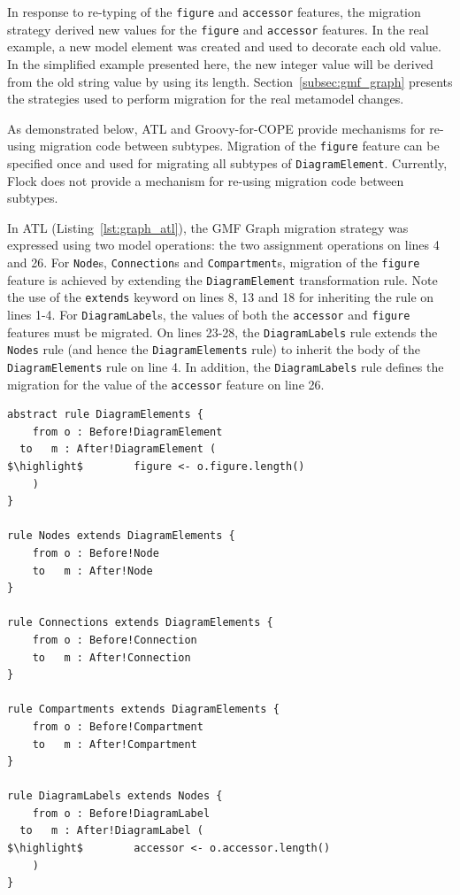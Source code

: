 In response to re-typing of the \texttt{figure} and \texttt{accessor} features, the
migration strategy derived new values for the \texttt{figure} and \texttt{accessor} features. In the real example, a new model element was created and used to decorate \cite{gamma95patterns} each old value. In the simplified example presented here, the new integer value will be derived from the old string value by using its length. Section~\ref{subsec:gmf_graph} presents the strategies used to perform migration for the real metamodel changes.

As demonstrated below, ATL and Groovy-for-COPE provide mechanisms for re-using migration code between subtypes. Migration of the \texttt{figure} feature can be specified once and used for migrating all subtypes of \texttt{DiagramElement}. Currently, Flock does not provide a mechanism for re-using migration code between subtypes.

In ATL (Listing~\ref{lst:graph_atl}), the GMF Graph migration strategy was expressed using two model operations: the two assignment operations on lines 4 and 26. For \texttt{Node}s, \texttt{Connection}s and \texttt{Compartment}s, migration of the \texttt{figure} feature is achieved by extending the \texttt{DiagramElement} transformation rule. Note the use of the \texttt{extends} keyword on lines 8, 13 and 18 for inheriting the rule on lines 1-4. For \texttt{DiagramLabel}s, the values of both the \texttt{accessor} and \texttt{figure} features must be migrated. On lines 23-28, the \texttt{DiagramLabels} rule extends the \texttt{Nodes} rule (and hence the \texttt{DiagramElements} rule) to inherit the body of the \texttt{DiagramElements} rule on line 4. In addition, the \texttt{DiagramLabels} rule defines the migration for the value of the \texttt{accessor} feature on line 26.

\begin{lstlisting}[float=tbp, caption=Simplified GMF Graph model migration in ATL, label=lst:graph_atl, language=ATL, tabsize=2]
abstract rule DiagramElements {
	from o : Before!DiagramElement
  to   m : After!DiagramElement (
$\highlight$ 		figure <- o.figure.length()
	)
}

rule Nodes extends DiagramElements {
	from o : Before!Node
	to   m : After!Node
}

rule Connections extends DiagramElements {
	from o : Before!Connection
	to   m : After!Connection
}

rule Compartments extends DiagramElements {
	from o : Before!Compartment
	to   m : After!Compartment
}

rule DiagramLabels extends Nodes {
	from o : Before!DiagramLabel
  to   m : After!DiagramLabel (
$\highlight$		accessor <- o.accessor.length()
	)
}
\end{lstlisting}

